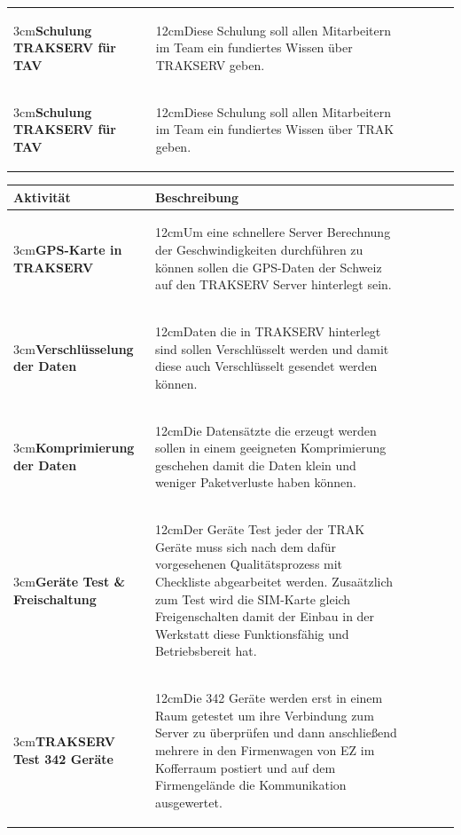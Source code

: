 \documentclass[a4paper,10pt]{scrartcl}
\newcommand\Umbruch[2][3cm]{\begin{varwidth}{#1}\centering#2\end{varwidth}}
\newcommand\Absatz[2][12cm]{\begin{varwidth}{#1}\flushleft#2\end{varwidth}}
\begin{document}
\begin{adjustbox}{width=\textwidth}
\begin{tabular}{llrrrr}
{{\linebreak}} \\
\midrule
{\Umbruch{\textbf{Schulung TRAKSERV für TAV}}}  & {\Absatz{Diese Schulung soll allen Mitarbeitern im Team ein fundiertes Wissen über TRAKSERV geben.
\linebreak}} \\
\midrule
{\Umbruch{\textbf{Schulung TRAKSERV für TAV}}}  & {\Absatz{Diese Schulung soll allen Mitarbeitern im Team ein fundiertes Wissen über TRAK geben.
\linebreak}} \\
\bottomrule
\end{tabular}
\end{adjustbox}
\pagebreak

\begin{adjustbox}{width=\textwidth}
\begin{tabular}{llrrrr} 
\toprule
\textbf{Aktivität} & \textbf{Beschreibung}\\
\midrule 
\midrule
{\Umbruch{\textbf{GPS-Karte in TRAKSERV}}}  & {\Absatz{Um eine schnellere Server Berechnung der Geschwindigkeiten durchführen zu können sollen die GPS-Daten der Schweiz auf den TRAKSERV Server hinterlegt sein.
\linebreak}} \\
\midrule
{\Umbruch{\textbf{Verschlüsselung der Daten}}}  & {\Absatz{Daten die in TRAKSERV hinterlegt sind
sollen Verschlüsselt werden und damit diese auch Verschlüsselt gesendet werden können.
\linebreak}} \\
\midrule
{\Umbruch{\textbf{Komprimierung der Daten}}}  & {\Absatz{Die Datensätzte die erzeugt werden sollen in einem geeigneten Komprimierung geschehen damit die Daten klein und weniger Paketverluste haben können.
\linebreak}} \\
\midrule
{\Umbruch{\textbf{Geräte Test \& Freischaltung}}}  & {\Absatz{Der Geräte Test jeder der TRAK Geräte muss sich nach dem dafür vorgesehenen Qualitätsprozess mit Checkliste abgearbeitet werden. Zusaätzlich zum Test wird die SIM-Karte gleich Freigenschalten damit der Einbau in der Werkstatt diese Funktionsfähig und Betriebsbereit hat.
\linebreak}} \\
\midrule
{\Umbruch{\textbf{TRAKSERV Test 342 Geräte}}}  & {\Absatz{Die 342 Geräte werden erst in einem Raum getestet um ihre Verbindung zum Server zu überprüfen und dann anschließend mehrere in den Firmenwagen von EZ im Kofferraum postiert und auf dem Firmengelände die Kommunikation ausgewertet.
\linebreak}} \\


\end{tabular}
\end{adjustbox}
\end{document}
